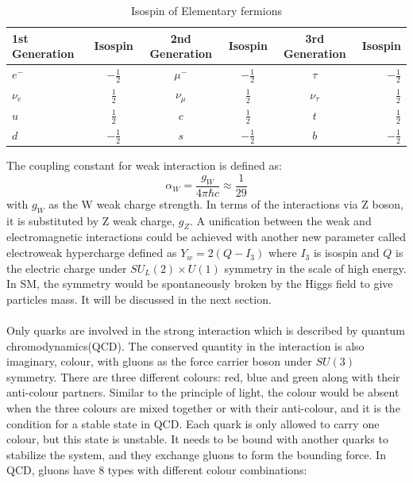 \begin{table}[h]
	\caption{Isospin of Elementary fermions}
	\renewcommand{\arraystretch}{1.2}
	\centering
	\begin{tabular}{l c c c c r}
		\hline
		\hline
		1st Generation &Isospin        &2nd Generation    &Isospin        &3rd Generation   &Isospin\\
		\hline
		$e^-$          &$-\frac{1}{2}$ &$\mu^-$           &$-\frac{1}{2}$ &$\tau$           &$-\frac{1}{2}$\\
		\hline
		$\nu_e$        &$\frac{1}{2}$  &$\nu_\mu$         &$\frac{1}{2}$  &$\nu_\tau$       &$\frac{1}{2}$\\
		\hline
		$u$            &$\frac{1}{2}$  &$c$               &$\frac{1}{2}$  &$t$              &$\frac{1}{2}$\\
		\hline
		$d$            &$-\frac{1}{2}$ &$s$               &$-\frac{1}{2}$ &$b$              &$-\frac{1}{2}$\\
		\hline

	\end{tabular}
    \label{Tab:isospin}
\end{table}
\noindent
The coupling constant for weak interaction is defined as:
\begin{equation}
\alpha_{W} = \frac{g_{W}}{4\pi\hbar c}\approx\frac{1}{29}
\end{equation}
with $g_{W}$ as the W weak charge strength. In terms of the interactions via Z boson, it is substituted by Z weak charge, $g_{Z}$. A unification between the weak and electromagnetic interactions could be achieved with another new parameter called electroweak hypercharge defined as $Y_w=2 (Q-I_3)$ where $I_3$ is isospin and $Q$ is the electric charge under $SU_L(2)\times U(1)$ symmetry in the scale of high energy.  In SM, the symmetry would be spontaneously broken by the Higgs field to give particles mass. It will be discussed in the next section.
\\
\\Only quarks are involved in the strong interaction which is described by quantum chromodynamics(QCD). The conserved quantity in the interaction is also imaginary, colour, with gluons as the force carrier boson under $SU(3)$ symmetry. There are three different colours: red, blue and green along with their anti-colour partners. Similar to the principle of light, the colour would be absent when the three colours are mixed together or with their anti-colour, and it is the condition for a stable state in QCD. Each quark is only allowed to carry one colour, but this state is unstable. It needs to be bound with another quarks to stabilize the system, and they exchange gluons to form the bounding force. In QCD, gluons have 8 types with different colour combinations:
